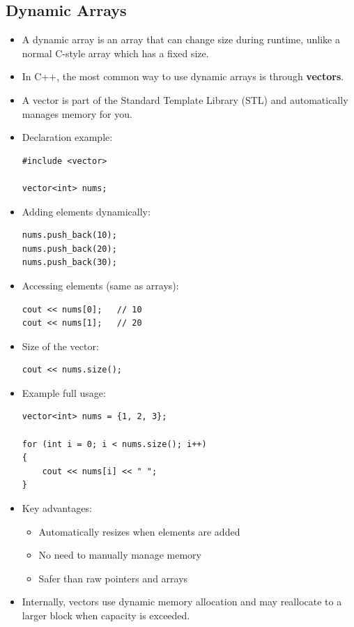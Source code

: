 \documentclass[10pt]{article}
\begin{document}
\subsection{Dynamic Arrays}
\begin{itemize}
	\item A dynamic array is an array that can change size during runtime, unlike a normal C-style array which has a fixed size.

	\item In C++, the most common way to use dynamic arrays is through \textbf{vectors}.

	\item A vector is part of the Standard Template Library (STL) and automatically manages memory for you.

	\item Declaration example:
	\begin{verbatim}
#include <vector>

vector<int> nums;
	\end{verbatim}

	\item Adding elements dynamically:
	\begin{verbatim}
nums.push_back(10);
nums.push_back(20);
nums.push_back(30);
	\end{verbatim}

	\item Accessing elements (same as arrays):
	\begin{verbatim}
cout << nums[0];   // 10
cout << nums[1];   // 20
	\end{verbatim}

	\item Size of the vector:
	\begin{verbatim}
cout << nums.size();
	\end{verbatim}

	\item Example full usage:
	\begin{verbatim}
vector<int> nums = {1, 2, 3};

for (int i = 0; i < nums.size(); i++)
{
    cout << nums[i] << " ";
}
	\end{verbatim}

	\item Key advantages:
	\begin{itemize}
		\item Automatically resizes when elements are added
		\item No need to manually manage memory
		\item Safer than raw pointers and arrays
	\end{itemize}

	\item Internally, vectors use dynamic memory allocation and may reallocate to a larger block when capacity is exceeded.
\end{itemize}
\end{document}

